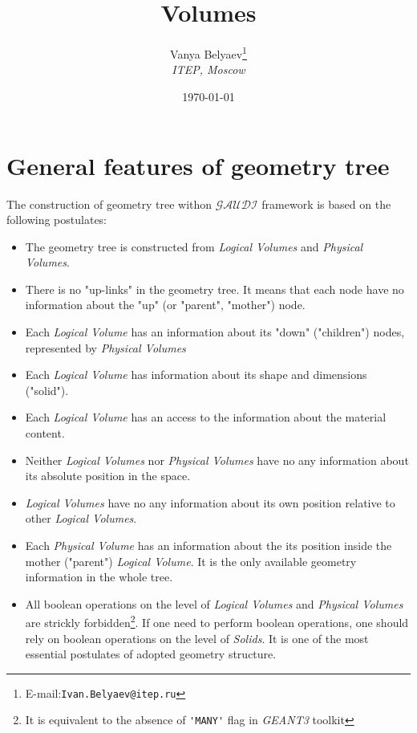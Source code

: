 		
\title{ Volumes } 
\author{Vanya Belyaev\footnote{E-mail:{\tt Ivan.Belyaev@itep.ru} } \\ {\it ITEP, Moscow}}
\date{ \today }	

 
\maketitle 	

\tableofcontents 

\section{ General features of geometry tree }

The construction of geometry tree withon 
${\mathcal{GAUDI}}$ framework is based on the following postulates:
\begin{itemize}
\item 
The geometry tree is constructed 
from {\it Logical Volumes} and {\it Physical Volumes}. 
\item 
There is no "up-links" in the geometry tree. It means that 
each node have no information about the "up" (or "parent", "mother") node.
\item 
Each {\it Logical Volume}  has an information about its 
"down" ("children") nodes, represented by {\it Physical Volumes}  
\item 
Each {\it Logical Volume}  has information about its shape and dimensions ("solid").
\item 
Each {\it Logical Volume} has an access to the information about the material content.
\item 
Neither  {\it Logical Volumes} nor 
{\it Physical Volumes} have no any information about its absolute position in the space. 
\item 
{\it Logical Volumes} have no any information about its own position relative to other 
{\it Logical Volumes}.
\item 
Each {\it Physical Volume } has an information about the its position inside the 
mother ("parent") {\it Logical Volume}. 
It is the only available geometry information in the whole tree.
\item 
All boolean operations on the level of {\it Logical Volumes}  and
{\it Physical Volumes} are strickly forbidden\footnote{ It is equivalent to 
the absence of \verb+'MANY'+ flag in {\it GEANT3} toolkit}. If one need 
to perform boolean operations, one should rely on boolean operations on the 
level of {\it Solids}. It is one of the most essential postulates of 
adopted geometry structure.   
\end{itemize} 	 

